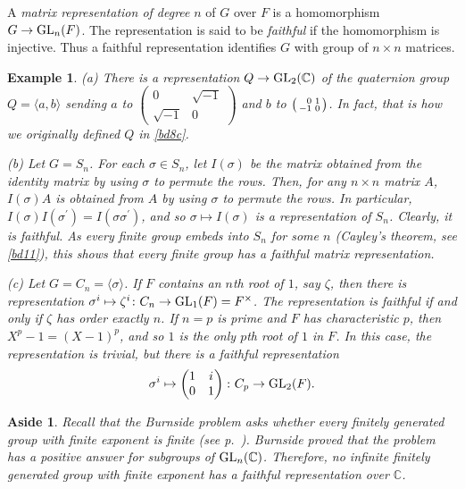 \documentclass[a4paper,11pt,final]{memoir}%
\newtheorem{example}[X]{Example}
\newtheorem{aside}[X]{Aside}
\theoremstyle{nonumberplain}
\begin{document}
A \emph{matrix representation of degree }$n$
%
of $G$ over $F$ is a homomorphism $G\rightarrow\operatorname{GL}_{n}(F)$. The representation
is said to be \emph{faithful}
%
if the homomorphism is injective. Thus a faithful representation identifies
$G$ with group of $n\times n$ matrices.

\begin{example}
\label{r1}(a) There is a representation $Q\rightarrow\operatorname{GL}_{2}(\mathbb{C})$ of
the quaternion group $Q=\langle a,b\rangle$ sending $a$ to $\left(
\begin{smallmatrix}
0 & \sqrt{-1}\\
\sqrt{-1} & 0
\end{smallmatrix}
\right)  $ and $b$ to $\left(
\begin{smallmatrix}
\hfill0 & 1\\
-1 & 0
\end{smallmatrix}
\right)  $. In fact, that is how we originally defined $Q$ in \ref{bd8c}.

(b) Let $G=S_{n}$. For each $\sigma\in S_{n}$, let $I(\sigma)$ be the matrix
obtained from the identity matrix by using $\sigma$ to permute the rows. Then,
for any $n\times n$ matrix $A$, $I(\sigma)A$ is obtained from $A$ by using
$\sigma$ to permute the rows. In particular, $I(\sigma)I(\sigma^{\prime
})=I(\sigma\sigma^{\prime})$, and so $\sigma\mapsto I(\sigma)$ is a
representation of $S_{n}$. Clearly, it is faithful. As every finite group
embeds into $S_{n}$ for some $n$ (Cayley's theorem, see \ref{bd11}), this
shows that every finite group has a faithful matrix representation.

(c) Let $G=C_{n}=\langle\sigma\rangle$. If $F$ contains an $n$th root of $1$,
say $\zeta$, then there is representation $\sigma^{i}\mapsto\zeta^{i}\colon
C_{n}\rightarrow\operatorname{GL}_{1}(F)=F^{\times}$. The representation is faithful if and
only if $\zeta$ has order exactly $n$. If $n=p$ is prime and $F$ has
characteristic $p$, then $X^{p}-1=(X-1)^{p}$, and so $1$ is the only $p$th
root of $1$ in $F$. In this case, the representation is trivial, but there is
a faithful representation%
\[
\sigma^{i}\mapsto%
\begin{pmatrix}
1 & i\\
0 & 1
\end{pmatrix}
\colon C_{p}\rightarrow\GL_{2}(F).
\]

\end{example}

\begin{aside}
\label{r1a}Recall that the Burnside problem asks whether every finitely
generated group with finite exponent is finite (see p.~\pageref{burnside}).
Burnside proved that the problem has a \textit{positive} answer for subgroups
of $\operatorname{GL}_{n}(\mathbb{C}{})$. Therefore, no infinite finitely generated group
with finite exponent has a faithful representation over $\mathbb{C}{}$.
\end{aside}
\end{document}
